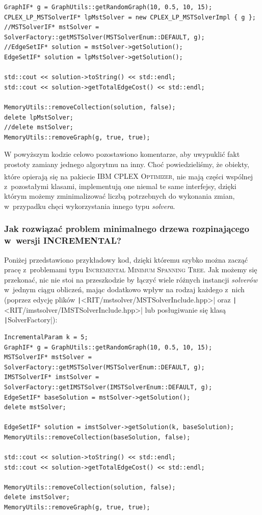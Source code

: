 \begin{verbatim}
GraphIF* g = GraphUtils::getRandomGraph(10, 0.5, 10, 15);
CPLEX_LP_MSTSolverIF* lpMstSolver = new CPLEX_LP_MSTSolverImpl { g };
//MSTSolverIF* mstSolver = SolverFactory::getMSTSolver(MSTSolverEnum::DEFAULT, g);
//EdgeSetIF* solution = mstSolver->getSolution();
EdgeSetIF* solution = lpMstSolver->getSolution();

std::cout << solution->toString() << std::endl;
std::cout << solution->getTotalEdgeCost() << std::endl;

MemoryUtils::removeCollection(solution, false);
delete lpMstSolver;
//delete mstSolver;
MemoryUtils::removeGraph(g, true, true);
\end{verbatim}

W powyższym kodzie celowo pozostawiono komentarze, aby uwypuklić fakt prostoty zamiany jednego algorytmu na inny.
Choć powiedzieliśmy, że obiekty, które opierają się na pakiecie \textsc{IBM\textsuperscript{\textregistered} CPLEX\textsuperscript{\textregistered} Optimizer}, nie mają części wspólnej z~pozostałymi klasami, implementują one niemal te same interfejsy, dzięki którym możemy zminimalizować liczbą potrzebnych do wykonania zmian, w~przypadku chęci wykorzystania innego typu \textit{solvera}.


\subsubsection{Jak rozwiązać problem minimalnego drzewa rozpinającego w~wersji INCREMENTAL?}


Poniżej przedstawiono przykładowy kod, dzięki któremu szybko można zacząć pracę z~problemami typu \textsc{Incremental Minimum Spanning Tree}.
Jak możemy się przekonać, nic nie stoi na przeszkodzie by łączyć wiele różnych instancji \textit{solverów} w~jednym ciągu obliczeń, mając dodatkowo wpływ na rodzaj każdego z~nich (poprzez edycję plików \texttt|<RIT/mstsolver/MSTSolverInclude.hpp>| oraz \texttt|<RIT/imstsolver/IMSTSolverInclude.hpp>| lub posługiwanie się klasą \texttt|SolverFactory|):

\begin{verbatim}
IncrementalParam k = 5;
GraphIF* g = GraphUtils::getRandomGraph(10, 0.5, 10, 15);
MSTSolverIF* mstSolver = SolverFactory::getMSTSolver(MSTSolverEnum::DEFAULT, g);
IMSTSolverIF* imstSolver = SolverFactory::getIMSTSolver(IMSTSolverEnum::DEFAULT, g);
EdgeSetIF* baseSolution = mstSolver->getSolution();
delete mstSolver;

EdgeSetIF* solution = imstSolver->getSolution(k, baseSolution);
MemoryUtils::removeCollection(baseSolution, false);

std::cout << solution->toString() << std::endl;
std::cout << solution->getTotalEdgeCost() << std::endl;

MemoryUtils::removeCollection(solution, false);
delete imstSolver;
MemoryUtils::removeGraph(g, true, true);
\end{verbatim}

